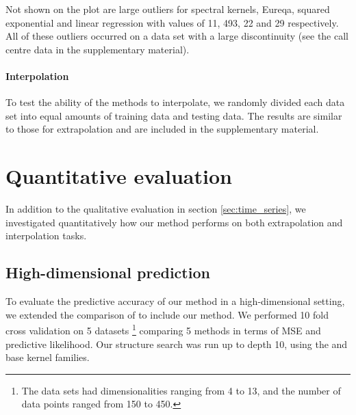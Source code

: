 Not shown on the plot are large outliers for spectral kernels, Eureqa, squared exponential and linear regression with values of 11, 493, 22 and 29 respectively.
All of these outliers occurred on a data set with a large discontinuity (see the call centre data in the supplementary material).

\paragraph{Interpolation}
To test the ability of the methods to interpolate, we randomly divided each data set into equal amounts of training data and testing data.
The results are similar to those for extrapolation and are included in the supplementary material.




\section{Quantitative evaluation}
\label{sec:quantitative}

In addition to the qualitative evaluation in section \ref{sec:time_series}, we investigated quantitatively how our method performs on both extrapolation and interpolation tasks.




\subsection{High-dimensional prediction}

To evaluate the predictive accuracy of our method in a high-dimensional setting, we extended the comparison of \cite{duvenaud2011additive11} to include our method.
We performed 10 fold cross validation on 5 datasets
\footnote{The data sets had dimensionalities ranging from 4 to 13, and the number of data points ranged from 150 to 450.} comparing 5 methods in terms of MSE and predictive likelihood.
Our structure search was run up to depth 10, using the \SE{} and \RQ{} base kernel families.

